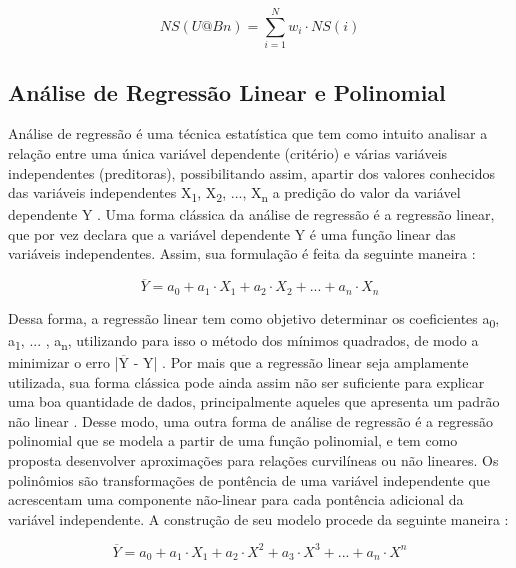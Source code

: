 \documentclass[[10pt,journal]{IEEEtran}
\newcommand{\textoverline}[1]{$\overline{\mbox{#1}}$}
\begin{document}
\begin{equation}
\label{eq:simi} 
NS(U@Bn) = \sum\limits_{i=1}^{N}w_i \cdot NS(i)
\end{equation}

\subsection{Análise de Regressão Linear e Polinomial}
Análise de regressão é uma técnica estatística que tem como intuito analisar a relação entre uma única variável dependente (critério) e várias variáveis independentes (preditoras), possibilitando assim, apartir dos valores conhecidos das variáveis independentes X\textsubscript{1}, X\textsubscript{2}, ..., X\textsubscript{n} a predição do valor da variável dependente Y \cite{hair}. Uma forma clássica da análise de regressão é a regressão linear, que por vez declara que a variável dependente Y é uma função linear das variáveis independentes. Assim, sua formulação é feita da seguinte maneira \cite{johnson1988}:

\begin{equation}
\label{eq:linear} 
 \overline{Y} = a_0 + a_1 \cdot X_1 + a_2 \cdot X_2 + ... + a_n \cdot X_n
\end{equation}

Dessa forma, a regressão linear tem como objetivo determinar os coeficientes a\textsubscript{0}, a\textsubscript{1}, ... , a\textsubscript{n}, utilizando para isso o método dos mínimos quadrados, de modo a minimizar o erro |\textoverline{Y} - Y| \cite{koh2007}. Por mais que a regressão linear seja amplamente utilizada, sua forma clássica pode ainda assim não ser suficiente para explicar uma boa quantidade de dados, principalmente aqueles que apresenta um padrão não linear \cite{pantula}. Desse modo, uma outra forma de análise de regressão é a regressão polinomial que se modela a partir de uma função polinomial, e tem como proposta desenvolver aproximações para relações curvilíneas ou não lineares. Os polinômios são transformações de pontência de uma variável independente que acrescentam uma componente não-linear para cada pontência adicional da variável independente. A construção de seu modelo procede da seguinte maneira \cite{hair}:

\begin{equation}
\label{eq:polinomio} 
 \overline{Y} = a_0 + a_1 \cdot X_1 + a_2 \cdot X^2 + a_3 \cdot X^3 + ... + a_n \cdot X^n
\end{equation}
\end{document}
